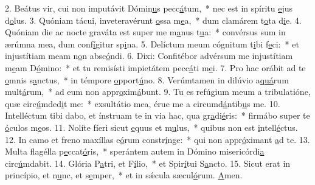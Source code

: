 2. Beátus vir, cui non imputávit Dómin\uline{u}s pecc\uline{á}tum,~* nec est in spíritu \uline{e}jus d\uline{o}lus.
3. Quóniam tácui, inveteravérunt \uline{o}ssa m\uline{e}a,~* dum clamárem t\uline{o}ta d\uline{i}e.
4. Quóniam die ac nocte graváta est super me m\uline{a}nus t\uline{u}a:~* convérsus sum in ærúmna mea, dum conf\uline{í}gitur sp\uline{i}na.
5. Delíctum meum cógnitum t\uline{i}bi f\uline{e}ci:~* et injustítiam meam n\uline{o}n absc\uline{ó}ndi.
6. Dixi: Confitébor advérsum me injustítiam m\uline{e}am D\uline{ó}mino:~* et tu remisísti impietátem pecc\uline{á}ti m\uline{e}i.
7. Pro hac orábit ad te \uline{o}mnis s\uline{a}nctus,~* in témpore \uline{o}pport\uline{ú}no.
8. Verúmtamen in dilúvio a\uline{quá}rum mult\uline{á}rum,~* ad eum non appr\uline{o}xim\uline{á}bunt.
9. Tu es refúgium meum a tribulatióne, quæ circ\uline{ú}mded\uline{i}t me:~* exsultátio mea, érue me a circumd\uline{á}ntib\uline{u}s me.
10. Intelléctum tibi dabo, et ínstruam te in via hac, qua gr\uline{a}di\uline{é}ris:~* firmábo super te \uline{ó}culos m\uline{e}os.
11. Nolíte fíeri sicut \uline{e}quus et m\uline{u}lus,~* quibus non est \uline{i}ntell\uline{é}ctus.
12. In camo et freno maxíllas e\uline{ó}rum constr\uline{í}nge:~* qui non appr\uline{ó}ximant \uline{a}d te.
13. Multa flagélla p\uline{e}ccat\uline{ó}ris,~* sperántem autem in Dómino misericórdi\uline{a} circ\uline{ú}mdabit.
14. Glória P\uline{a}tri, et F\uline{í}lio,~* et Spir\uline{í}tui S\uline{a}ncto.
15. Sicut erat in princípio, et n\uline{u}nc, et s\uline{e}mper,~* et in sǽcula sæcul\uline{ó}rum. \uline{A}men.
